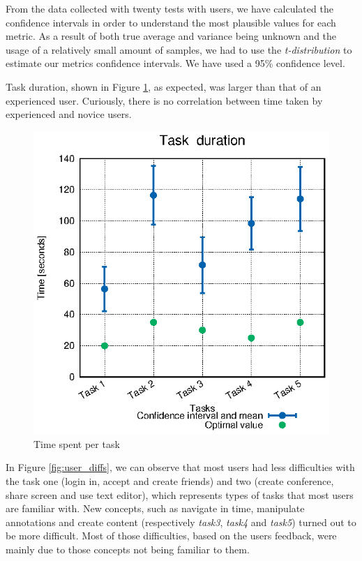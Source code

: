 \documentclass[10pt,conference]{IEEEtran}
\begin{document}
From the data collected with twenty tests with users, we have calculated the confidence intervals in order to understand the most plausible values for each metric.
As a result of both true average and variance being unknown and the usage of a relatively small amount of samples, we had to use the \emph{t-distribution} to estimate our metrics confidence intervals.
We have used a 95\% confidence level.

Task duration, shown in Figure \ref{fig:user_times}, as expected, was larger than that of an experienced user.
Curiously, there is no correlation between time taken by experienced and novice users.

\begin{figure}
  \centering
    \includegraphics[width=0.75\linewidth]{stats/user_times.eps}
    \caption{Time spent per task}
    \label{fig:user_times}
\end{figure}

In Figure \ref{fig:user_diffs}, we can observe that most users had less difficulties with the task one (login in, accept and create friends) and two (create conference, share screen and use text editor), which represents types of tasks that most users are familiar with.
New concepts, such as navigate in time, manipulate annotations and create content (respectively \emph{task3}, \emph{task4} and \emph{task5}) turned out to be more difficult.
 Most of those difficulties, based on the users feedback, were mainly due to those concepts not being familiar to them.
\end{document}
